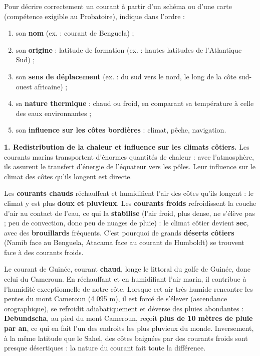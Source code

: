 \documentclass[11pt]{article}
\newcommand{\cle}[1]{{\popxbold\color{popdark}#1}}
\newcounter{popsec}
\newcounter{popsub}
\newcommand{\courssub}[1]{%
  \stepcounter{popsub}%
  \par\vspace{9pt}\noindent{\popxbold\fontsize{11.5}{13}\selectfont\color{popink}{\color{poporange}\thepopsec.\thepopsub}\hspace{6pt}#1}\par\nopagebreak\vspace{4pt}
}
\begin{document}
\begin{methode}
Pour décrire correctement un courant à partir d'un schéma ou d'une carte (compétence exigible au Probatoire), indique dans l'ordre :
\begin{enumerate}
\item son \textbf{nom} (ex. : courant de Benguela) ;
\item son \textbf{origine} : latitude de formation (ex. : hautes latitudes de l'Atlantique Sud) ;
\item son \textbf{sens de déplacement} (ex. : du sud vers le nord, le long de la côte sud-ouest africaine) ;
\item sa \textbf{nature thermique} : chaud ou froid, en comparant sa température à celle des eaux environnantes ;
\item son \textbf{influence sur les côtes bordières} : climat, pêche, navigation.
\end{enumerate}
\end{methode}

\courssub{Le rôle des courants marins}

\textbf{1. Redistribution de la chaleur et influence sur les climats côtiers.} Les courants marins transportent d'énormes quantités de chaleur : avec l'atmosphère, ils assurent le transfert d'énergie de l'équateur vers les pôles. Leur influence sur le climat des côtes qu'ils longent est directe.

\begin{propriete}
Les \textbf{courants chauds} réchauffent et humidifient l'air des côtes qu'ils longent : le climat y est plus \textbf{doux et pluvieux}. Les \textbf{courants froids} refroidissent la couche d'air au contact de l'eau, ce qui la \textbf{stabilise} (l'air froid, plus dense, ne s'élève pas ; peu de convection, donc peu de nuages de pluie) : le climat côtier devient \textbf{sec}, avec des \textbf{brouillards} fréquents. C'est pourquoi de grands \textbf{déserts côtiers} (Namib face au Benguela, Atacama face au courant de Humboldt) se trouvent face à des courants froids.
\end{propriete}

\begin{savaistu}
Le \cle{courant de Guinée}, courant \textbf{chaud}, longe le littoral du golfe de Guinée, donc celui du Cameroun. En réchauffant et en humidifiant l'air marin, il contribue à l'humidité exceptionnelle de notre côte. Lorsque cet air très humide rencontre les pentes du mont Cameroun (4 095 m), il est forcé de s'élever (ascendance orographique), se refroidit adiabatiquement et déverse des pluies abondantes : \textbf{Debundscha}, au pied du mont Cameroun, reçoit \textbf{plus de 10 mètres de pluie par an}, ce qui en fait l'un des endroits les plus pluvieux du monde. Inversement, à la même latitude que le Sahel, des côtes baignées par des courants froids sont presque désertiques : la nature du courant fait toute la différence.
\end{savaistu}
\end{document}
